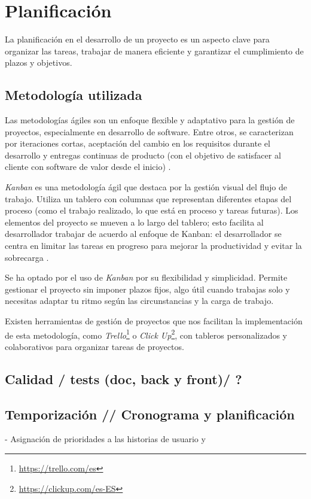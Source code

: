 \chapter{Planificación}

La planificación en el desarrollo de un proyecto es un aspecto clave para organizar las tareas, trabajar de manera eficiente y garantizar el cumplimiento de plazos y objetivos.

\section{Metodología utilizada}
Las metodologías ágiles son un enfoque flexible y adaptativo para la gestión de proyectos, especialmente en desarrollo de software. Entre otros, se caracterizan por iteraciones cortas, aceptación del cambio en los requisitos durante el desarrollo y entregas continuas de producto (con el objetivo de satisfacer al cliente con software de valor desde el inicio) \cite{agileprinciples}.

\textit{Kanban} es una metodología ágil que destaca por la gestión visual del flujo de trabajo. Utiliza un tablero con columnas que representan diferentes etapas del proceso (como el trabajo realizado, lo que está en proceso y tareas futuras). Los elementos del proyecto se mueven a lo largo del tablero; esto facilita al desarrollador trabajar de acuerdo al enfoque de Kanban: el desarrollador se centra en limitar las tareas en progreso para mejorar la productividad y evitar la sobrecarga \cite{majkamastering}.

Se ha optado por el uso de \textit{Kanban} por su flexibilidad y simplicidad. Permite gestionar el proyecto sin imponer plazos fijos, algo útil cuando trabajas solo y necesitas adaptar tu ritmo según las circunstancias y la carga de trabajo.

Existen herramientas de gestión de proyectos que nos facilitan la implementación de esta metodología, como \textit{Trello}\footnote{\url{https://trello.com/es}} o \textit{Click Up}\footnote{\url{https://clickup.com/es-ES}}, con tableros personalizados y colaborativos para organizar tareas de proyectos.

\section{Calidad / tests (doc, back y front)/ ?}

\section{Temporización // Cronograma y planificación}
- Asignación de prioridades a las historias de usuario y 


